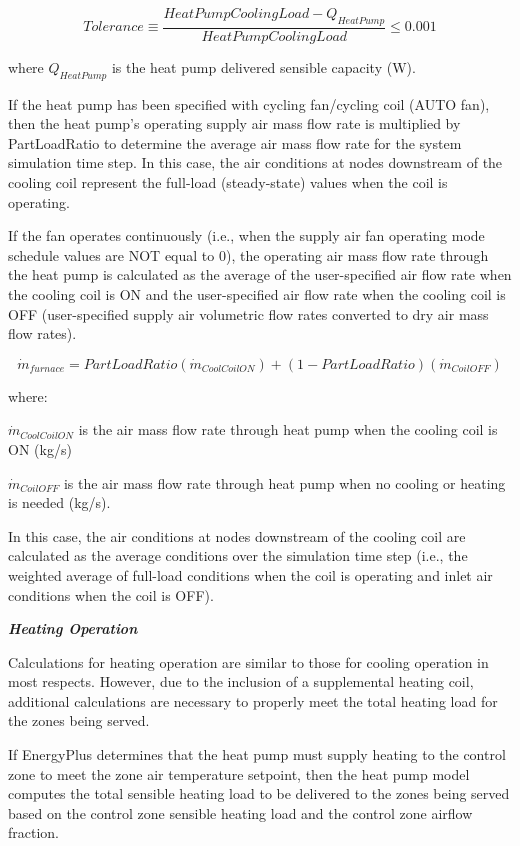 \begin{equation}
  Tolerance \equiv \frac{HeatPumpCoolingLoad - Q_{HeatPump}}{HeatPumpCoolingLoad} \leq 0.001
\end{equation}

where \(Q_{HeatPump}\) is the heat pump delivered sensible capacity (W).

If the heat pump has been specified with cycling fan/cycling coil (AUTO fan), then the heat pump's operating supply air mass flow rate is multiplied by PartLoadRatio to determine the average air mass flow rate for the system simulation time step. In this case, the air conditions at nodes downstream of the cooling coil represent the full-load (steady-state) values when the coil is operating.

If the fan operates continuously (i.e., when the supply air fan operating mode schedule values are NOT equal to 0), the operating air mass flow rate through the heat pump is calculated as the average of the user-specified air flow rate when the cooling coil is ON and the user-specified air flow rate when the cooling coil is OFF (user-specified supply air volumetric flow rates converted to dry air mass flow rates).

\begin{equation}
{\dot{m}_{furnace}} = PartLoadRatio\left( {\dot{m}_{CoolCoilON}} \right) + \left( {1 - PartLoadRatio} \right)\left( {\dot{m}_{CoilOFF}} \right)
\end{equation}

where:

\({\dot{m}_{CoolCoilON}}\) is the air mass flow rate through heat pump when the cooling coil is ON (kg/s)

\({\dot{m}_{CoilOFF}}\) is the air mass flow rate through heat pump when no cooling or heating is needed (kg/s).

In this case, the air conditions at nodes downstream of the cooling coil are calculated as the average conditions over the simulation time step (i.e., the weighted average of full-load conditions when the coil is operating and inlet air conditions when the coil is OFF).

\emph{\textbf{Heating Operation}}

Calculations for heating operation are similar to those for cooling operation in most respects. However, due to the inclusion of a supplemental heating coil, additional calculations are necessary to properly meet the total heating load for the zones being served.

If EnergyPlus determines that the heat pump must supply heating to the control zone to meet the zone air temperature setpoint, then the heat pump model computes the total sensible heating load to be delivered to the zones being served based on the control zone sensible heating load and the control zone airflow fraction.

